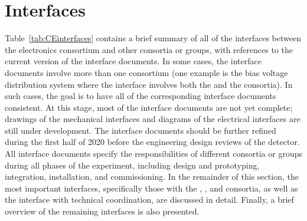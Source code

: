 \section{Interfaces}
\label{sec:fdsp-tpcelec-interfaces}

Table~\ref{tab:CEinterfaces} contains a brief summary of all of the interfaces
between the  electronics consortium and other consortia or groups,
with references to the current version of the interface documents. 
In some cases, the interface documents involve more than one 
consortium (one example is the bias voltage distribution system where
the interface involves both the  and the  consortia).
In such cases, the goal is to have all of the corresponding interface documents 
consistent. At this stage, most of the interface documents are
not yet complete; drawings of the mechanical interfaces and diagrams
of the electrical interfaces are still under development. The interface 
documents should be further refined during the 
first half of 2020 before the engineering design
reviews of the detector. All interface documents specify the responsibilities
of different consortia or groups during all phases of the experiment,
including design and prototyping, integration, installation,
and commissioning. In the remainder of this section, the most
important interfaces, specifically those with the , , and 
consortia, as well as the interface with technical coordination, are discussed in detail.
Finally, a brief overview of the remaining interfaces is also presented.

